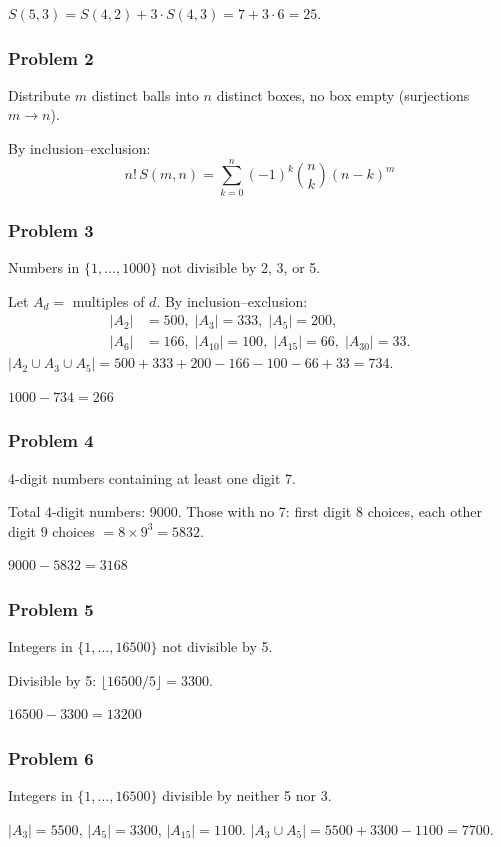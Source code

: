 $S(5,3) = S(4,2)+3\cdot S(4,3) = 7 + 3\cdot 6 = \boxed{25}$.

\subsubsection*{Problem 2}
Distribute $m$ distinct balls into $n$ distinct boxes, no box empty (surjections $m\to n$).

By inclusion--exclusion:
\[
  \boxed{n!\,S(m,n) = \sum_{k=0}^{n}(-1)^k\binom{n}{k}(n-k)^m}
\]

\subsubsection*{Problem 3}
Numbers in $\{1,\dots,1000\}$ not divisible by 2, 3, or 5.

Let $A_d = $ multiples of $d$. By inclusion--exclusion:
\begin{align*}
|A_2|&=500,\; |A_3|=333,\; |A_5|=200,\\
|A_6|&=166,\; |A_{10}|=100,\; |A_{15}|=66,\; |A_{30}|=33.
\end{align*}
$|A_2\cup A_3\cup A_5|=500+333+200-166-100-66+33=734$.

$\boxed{1000-734=266}$

\subsubsection*{Problem 4}
4-digit numbers containing at least one digit 7.

Total 4-digit numbers: 9000. Those with no 7: first digit $8$ choices, each other digit $9$ choices $= 8\times 9^3 = 5832$.

$\boxed{9000-5832=3168}$

\subsubsection*{Problem 5}
Integers in $\{1,\dots,16500\}$ not divisible by 5.

Divisible by 5: $\lfloor 16500/5\rfloor = 3300$.

$\boxed{16500-3300=13200}$

\subsubsection*{Problem 6}
Integers in $\{1,\dots,16500\}$ divisible by neither 5 nor 3.

$|A_3|=5500$, $|A_5|=3300$, $|A_{15}|=1100$.
$|A_3\cup A_5|=5500+3300-1100=7700$.


